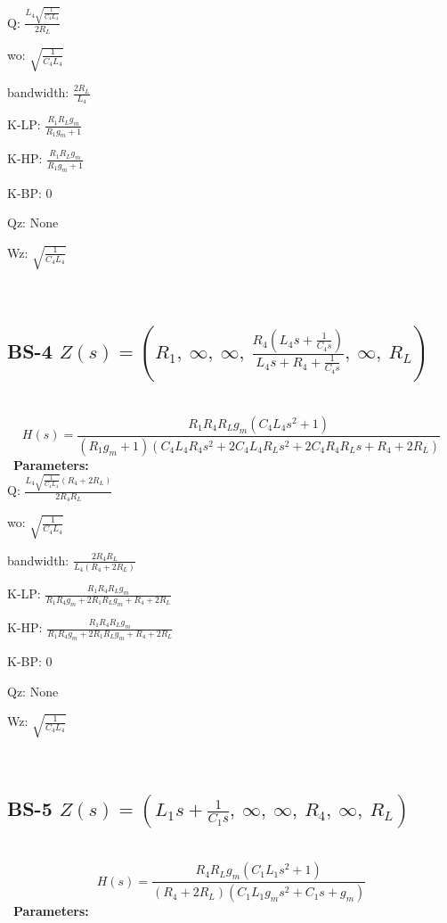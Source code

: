 \documentclass{article}
\begin{document}
Q: $\frac{L_{4} \sqrt{\frac{1}{C_{4} L_{4}}}}{2 R_{L}}$\ 

wo: $\sqrt{\frac{1}{C_{4} L_{4}}}$\ 

bandwidth: $\frac{2 R_{L}}{L_{4}}$\ 

K-LP: $\frac{R_{1} R_{L} g_{m}}{R_{1} g_{m} + 1}$\ 

K-HP: $\frac{R_{1} R_{L} g_{m}}{R_{1} g_{m} + 1}$\ 

K-BP: $0$\ 

Qz: $\text{None}$\ 

Wz: $\sqrt{\frac{1}{C_{4} L_{4}}}$\ 

\ 

\subsection{BS-4 $Z(s) = \left( R_{1}, \  \infty, \  \infty, \  \frac{R_{4} \left(L_{4} s + \frac{1}{C_{4} s}\right)}{L_{4} s + R_{4} + \frac{1}{C_{4} s}}, \  \infty, \  R_{L}\right)$ } \ 
\textbf{\[H(s) = \frac{R_{1} R_{4} R_{L} g_{m} \left(C_{4} L_{4} s^{2} + 1\right)}{\left(R_{1} g_{m} + 1\right) \left(C_{4} L_{4} R_{4} s^{2} + 2 C_{4} L_{4} R_{L} s^{2} + 2 C_{4} R_{4} R_{L} s + R_{4} + 2 R_{L}\right)}\] } \ 
\textbf{Parameters:}\\ 

Q: $\frac{L_{4} \sqrt{\frac{1}{C_{4} L_{4}}} \left(R_{4} + 2 R_{L}\right)}{2 R_{4} R_{L}}$\ 

wo: $\sqrt{\frac{1}{C_{4} L_{4}}}$\ 

bandwidth: $\frac{2 R_{4} R_{L}}{L_{4} \left(R_{4} + 2 R_{L}\right)}$\ 

K-LP: $\frac{R_{1} R_{4} R_{L} g_{m}}{R_{1} R_{4} g_{m} + 2 R_{1} R_{L} g_{m} + R_{4} + 2 R_{L}}$\ 

K-HP: $\frac{R_{1} R_{4} R_{L} g_{m}}{R_{1} R_{4} g_{m} + 2 R_{1} R_{L} g_{m} + R_{4} + 2 R_{L}}$\ 

K-BP: $0$\ 

Qz: $\text{None}$\ 

Wz: $\sqrt{\frac{1}{C_{4} L_{4}}}$\ 

\ 

\subsection{BS-5 $Z(s) = \left( L_{1} s + \frac{1}{C_{1} s}, \  \infty, \  \infty, \  R_{4}, \  \infty, \  R_{L}\right)$ } \ 
\textbf{\[H(s) = \frac{R_{4} R_{L} g_{m} \left(C_{1} L_{1} s^{2} + 1\right)}{\left(R_{4} + 2 R_{L}\right) \left(C_{1} L_{1} g_{m} s^{2} + C_{1} s + g_{m}\right)}\] } \ 
\textbf{Parameters:}\\ 
\end{document}
